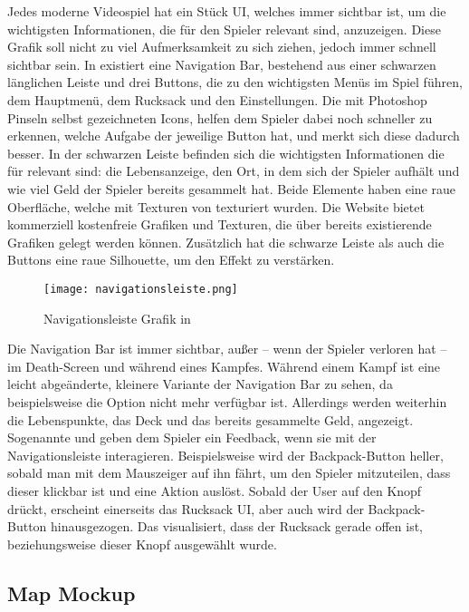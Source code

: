 Jedes moderne Videospiel hat ein Stück UI, welches immer sichtbar ist, um die wichtigsten Informationen, die für den Spieler relevant sind, anzuzeigen. Diese Grafik soll nicht zu viel Aufmerksamkeit zu sich ziehen, jedoch immer schnell sichtbar sein.
In \FF existiert eine Navigation Bar, bestehend aus einer schwarzen länglichen Leiste und drei Buttons, die zu den wichtigsten Menüs im Spiel führen, dem Hauptmenü, dem Rucksack und den Einstellungen. Die mit Photoshop Pinseln selbst gezeichneten Icons, helfen dem Spieler dabei noch schneller zu erkennen, welche Aufgabe der jeweilige Button hat, und merkt sich diese dadurch besser. In der schwarzen Leiste befinden sich die wichtigsten Informationen die für \FF relevant sind: die Lebensanzeige, den Ort, in dem sich der Spieler aufhält und wie viel Geld der Spieler bereits gesammelt hat. Beide Elemente haben eine raue Oberfläche, welche mit Texturen von
texturiert wurden. Die Website bietet kommerziell kostenfreie Grafiken und Texturen, die über bereits existierende Grafiken gelegt werden können. Zusätzlich hat die schwarze Leiste als auch die Buttons eine raue Silhouette, um den Effekt zu verstärken.

\begin{figure}[H]
    \centering
    \texttt{[image: navigationsleiste.png]}
    \caption{Navigationsleiste Grafik in \FF}
\end{figure}

Die Navigation Bar ist immer sichtbar, außer – wenn der Spieler verloren hat – im Death-Screen und während eines Kampfes. Während einem Kampf ist eine leicht abgeänderte, kleinere Variante der Navigation Bar zu sehen, da beispielsweise die Option
nicht mehr verfügbar ist. Allerdings werden weiterhin die Lebenspunkte, das Deck und das bereits gesammelte Geld, angezeigt.
Sogenannte  und  geben dem Spieler ein Feedback, wenn sie mit der Navigationsleiste interagieren. Beispielsweise wird der Backpack-Button heller, sobald man mit dem Mauszeiger auf ihn fährt, um den Spieler mitzuteilen, dass dieser klickbar ist und eine Aktion auslöst. Sobald der User auf den Knopf drückt, erscheint einerseits das Rucksack UI, aber auch wird der Backpack-Button hinausgezogen. Das visualisiert, dass der Rucksack gerade offen ist, beziehungsweise dieser Knopf ausgewählt wurde.

\subsection{Map Mockup}

